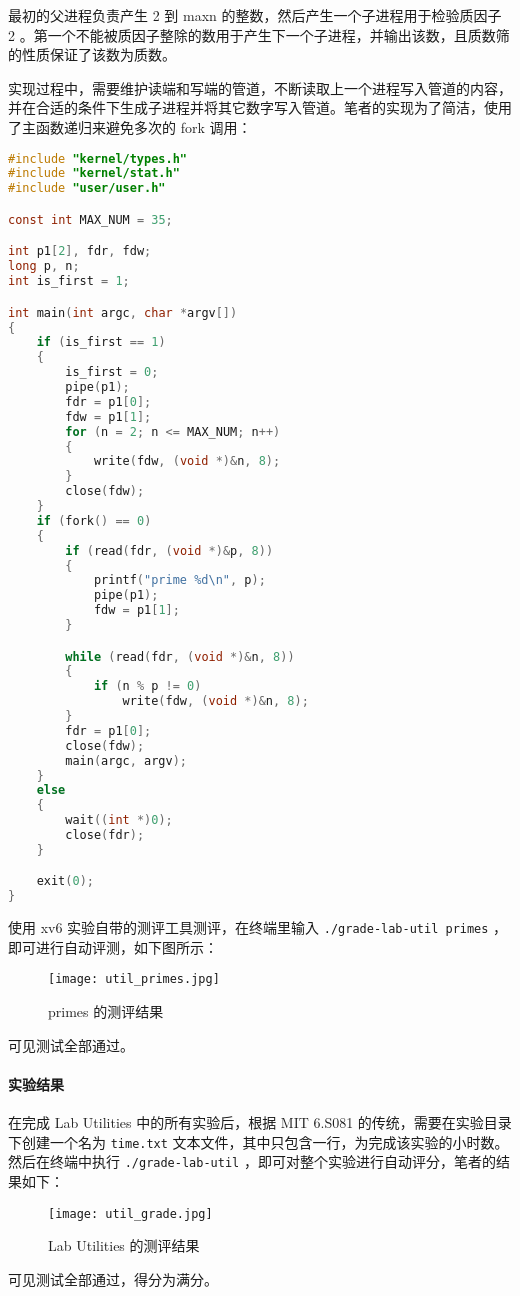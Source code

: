 最初的父进程负责产生 2 到 maxn 的整数，然后产生一个子进程用于检验质因子 2 。第一个不能被质因子整除的数用于产生下一个子进程，并输出该数，且质数筛的性质保证了该数为质数。

实现过程中，需要维护读端和写端的管道，不断读取上一个进程写入管道的内容，并在合适的条件下生成子进程并将其它数字写入管道。笔者的实现为了简洁，使用了主函数递归来避免多次的 fork 调用：
\begin{lstlisting}[language=C]
#include "kernel/types.h"
#include "kernel/stat.h"
#include "user/user.h"

const int MAX_NUM = 35;

int p1[2], fdr, fdw;
long p, n;
int is_first = 1;

int main(int argc, char *argv[])
{
    if (is_first == 1)
    {
        is_first = 0;
        pipe(p1);
        fdr = p1[0];
        fdw = p1[1];
        for (n = 2; n <= MAX_NUM; n++)
        {
            write(fdw, (void *)&n, 8);
        }
        close(fdw);
    }
    if (fork() == 0)
    {
        if (read(fdr, (void *)&p, 8))
        {
            printf("prime %d\n", p);
            pipe(p1);
            fdw = p1[1];
        }

        while (read(fdr, (void *)&n, 8))
        {
            if (n % p != 0)
                write(fdw, (void *)&n, 8);
        }
        fdr = p1[0];
        close(fdw);
        main(argc, argv);
    }
    else
    {
        wait((int *)0);
        close(fdr);
    }

    exit(0);
}
\end{lstlisting}

使用 xv6 实验自带的测评工具测评，在终端里输入 \lstinline{./grade-lab-util primes} ，即可进行自动评测，如下图所示：
\begin{figure}[H]
  \centering
  \texttt{[image: util\_primes.jpg]}
  \caption{ primes 的测评结果}
\end{figure}
可见测试全部通过。

\paragraph*{实验结果} 在完成 Lab Utilities 中的所有实验后，根据 MIT 6.S081 的传统，需要在实验目录下创建一个名为 \lstinline{time.txt} 文本文件，其中只包含一行，为完成该实验的小时数。然后在终端中执行 \lstinline{./grade-lab-util} ，即可对整个实验进行自动评分，笔者的结果如下：
\begin{figure}[H]
  \centering
  \texttt{[image: util\_grade.jpg]}
  \caption{ Lab Utilities 的测评结果}
\end{figure}
可见测试全部通过，得分为满分。

